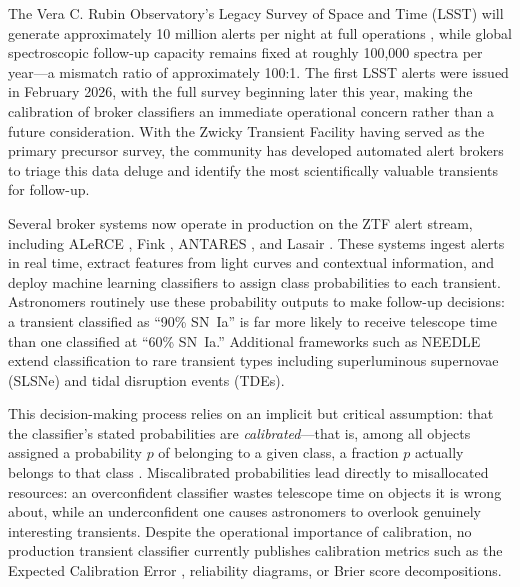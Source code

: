 \documentclass[twocolumn]{aastex631}
\begin{document}
The Vera C. Rubin Observatory's Legacy Survey of Space and Time (LSST) will generate approximately 10 million alerts per night at full operations \citep{ivezic2019}, while global spectroscopic follow-up capacity remains fixed at roughly 100,000 spectra per year---a mismatch ratio of approximately 100:1. The first LSST alerts were issued in February 2026, with the full survey beginning later this year, making the calibration of broker classifiers an immediate operational concern rather than a future consideration. With the Zwicky Transient Facility \citep[ZTF;][]{bellm2019} having served as the primary precursor survey, the community has developed automated alert brokers to triage this data deluge and identify the most scientifically valuable transients for follow-up.

Several broker systems now operate in production on the ZTF alert stream, including ALeRCE \citep{forster2021}, Fink \citep{moller2021}, ANTARES \citep{narayan2018}, and Lasair \citep{smith2019}. These systems ingest alerts in real time, extract features from light curves and contextual information, and deploy machine learning classifiers to assign class probabilities to each transient. Astronomers routinely use these probability outputs to make follow-up decisions: a transient classified as ``90\% SN~Ia'' is far more likely to receive telescope time than one classified at ``60\% SN~Ia.'' Additional frameworks such as NEEDLE \citep{sheng2024} extend classification to rare transient types including superluminous supernovae (SLSNe) and tidal disruption events (TDEs).

This decision-making process relies on an implicit but critical assumption: that the classifier's stated probabilities are \emph{calibrated}---that is, among all objects assigned a probability $p$ of belonging to a given class, a fraction $p$ actually belongs to that class \citep{dawid1982}. Miscalibrated probabilities lead directly to misallocated resources: an overconfident classifier wastes telescope time on objects it is wrong about, while an underconfident one causes astronomers to overlook genuinely interesting transients. Despite the operational importance of calibration, no production transient classifier currently publishes calibration metrics such as the Expected Calibration Error \citep[ECE;][]{naeini2015}, reliability diagrams, or Brier score decompositions.
\end{document}
